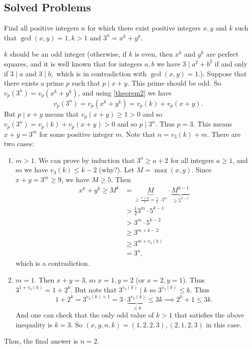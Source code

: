 \documentclass[main.tex]{subfile}
\begin{document}
\subsection{Solved Problems}


    \begin{problem}[Russia 1996]
        Find all positive integers $n$ for which there exist positive integers $x ,y$ and $k$ such that $\gcd(x,y)=1, k>1$ and $3^n = x^k + y^k.$
    \end{problem}

    \begin{solution}
        $k$ should be an odd integer (otherwise, if $k$ is even, then $x^k$ and $y^k$ are perfect squares, and it is well known that for integers $a,b$ we have $3 \mid a^2+b^2$ if and only if $3 \mid a$ and $3 \mid b,$ which is in contradiction with $\gcd(x,y)=1.$). Suppose that there exists a prime $p$ such that $p \mid x+y$. This prime should be odd. So $v_p(3^n)=v_p(x^k+y^k)$, and using \eqref{theorem2} we have $$v_p(3^n)=v_p(x^k+y^k)=v_p(k)+v_p(x+y).$$ But $p \mid x+y$ means that $v_p(x+y) \geq 1 >0$ and so $v_p(3^n)=v_p(k)+v_p(x+y) >0$ and so $p \mid 3^n$. Thus $p=3.$ This means $x+y=3^m$ for some positive integer $m$. Note that $n=v_3(k)+m$. There are two cases:
            \begin{enumerate}
                \item $m>1$. We can prove by induction that $3^a \ge a+2$ for all integers $a\ge 1$, and so we have $v_3(k) \leq k-2$ (why?). Let $M= \max(x,y)$. Since $x+y=3^m\ge 9$, we have $M \geq 5$. Then
                \begin{align*}
	                x^k+ y^k \geq M^k  & =  \underbrace{M}_{\geq \frac{x+y}{2} = \frac{1}{2} \cdot 3^m} \cdot \underbrace{M^{k-1}}_{\geq 5^{k-1}} \\
	                & > \frac{1}{2} 3^m \cdot 5^{k-1} \\
	                &  >3^m \cdot 5^{k-2}\\
	                & \geq 3^{m+k-2} \\
	                & \geq 3^{m + v_3(k)}\\
	                & = 3^n,
                \end{align*}
                which is a contradiction.

                \item $m=1$. Then $x+y=3$, so $x=1, y=2$ (or $x=2, y=1$). Thus $3^{1+v_3(k)}= 1+2^k$. But note that
                $3^{v_3(k)} \mid k$ so $3^{v_3(k)} \leq k$. Thus
                \[1+2^k = 3^{v_3(k)+1} = 3 \cdot \underbrace{3^{v_3(k)}}_{\leq k} \leq 3k \implies 2^k +1 \leq 3k .\]
                And one can check that the only odd value of $k>1$ that satisfies the above inequality is $k=3$. So $(x,y,n,k)=(1,2,2,3), (2,1,2,3)$ in this case.
            \end{enumerate}
    Thus, the final answer is $n=2.$

    \end{solution}
\end{document}
